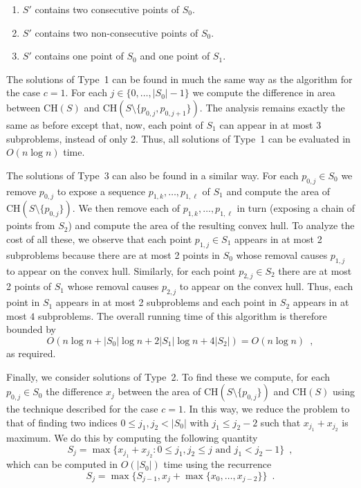 \documentclass[lotsofwhite]{patmorin}
\newcommand{\ch}{\mathrm{CH}}
\begin{document}
\begin{enumerate}
\item $S'$ contains two consecutive points of $S_0$.
\item $S'$ contains two non-consecutive points of $S_0$.
\item $S'$ contains one point of $S_0$ and one point of $S_1$.
\end{enumerate}

The solutions of Type~1 can be found in much the same way as the
algorithm for the case $c=1$.  For each $j\in\{0,\ldots,|S_0|-1\}$ we
compute the difference in area between $\ch(S)$ and
$\ch(S\setminus\{p_{0,j},p_{0,j+1}\})$.  The analysis remains exactly
the same as before except that, now, each point of $S_1$ can appear in
at most $3$ subproblems, instead of only 2.  Thus, all solutions of
Type~1 can be evaluated in $O(n\log n)$ time.


The solutions of Type~3 can also be found in a similar way.  For each
$p_{0,j}\in S_0$ we remove $p_{0,j}$ to expose a sequence
$p_{1,k},\ldots,p_{1,\ell}$ of $S_1$ and compute the area of
$\ch(S\setminus\{p_{0,j}\})$.  We then remove each of
$p_{1,k},\ldots,p_{1,\ell}$ in turn (exposing a chain of points from
$S_2$) and compute the area of the resulting convex hull.  To analyze
the cost of all these, we observe that each point $p_{1,j}\in S_1$
appears in at most 2 subproblems because there are at most 2 points in
$S_0$ whose removal causes $p_{1,j}$ to appear on the convex hull.
Similarly, for each point $p_{2,j}\in S_2$ there are at most 2 points
of $S_1$ whose removal causes $p_{2,j}$ to appear on the convex hull.
Thus, each point in $S_1$ appears in at most 2 subproblems and each
point in $S_2$ appears in at most $4$ subproblems.  The overall
running time of this algorithm is therefore bounded by
\[
    O\left(n\log n + |S_0|\log n + 2|S_1|\log n + 4|S_2|\right) = O(n\log n) \enspace ,
\]
as required.

Finally, we consider solutions of Type~2.  To find these we compute,
for each $p_{0,j}\in S_0$ the difference $x_j$ between the area of
$\ch(S\setminus\{p_{0,j}\})$ and $\ch(S)$ using the technique
described for the case $c=1$.  In this way, we reduce the problem to
that of finding two indices $0\le j_1,j_2< |S_0|$ with $j_1\le j_2-2$ such that
$x_{j_1}+x_{j_2}$ is maximum.  We do this
by computing the following quantity
\[
     S_j = \max\{x_{j_1}+x_{j_2} :
       \mbox{$0\le j_1,j_2\le j$ and $j_1 < j_2-1$}\} \enspace ,
\]
which can be computed in $O(|S_0|)$ time using the recurrence
\[
    S_j = \max\{S_{j-1}, x_{j} + \max\{x_{0},\ldots,x_{j-2}\}\}
                \enspace .
\]
\end{document}
